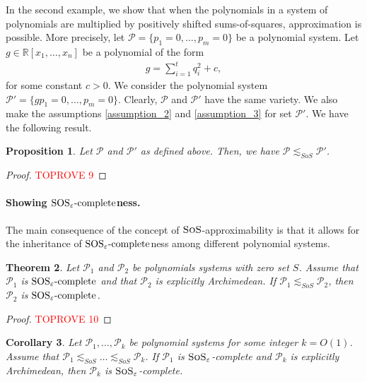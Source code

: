 \documentclass[11pt]{article}
\newcommand{\sos}{\text{\sc{SoS}}}
\newcommand{\1}{\textbf{1}}
\newtheorem{theorem}{Theorem}[section]
\newtheorem{proposition}[theorem]{Proposition}
\newtheorem{corollary}[theorem]{Corollary}
\newcommand{\SOSe}{\rm{SOS}_\varepsilon\text{-complete}}
\begin{document}
In the second example, we show that when the polynomials in a system of polynomials are multiplied by positively shifted sums-of-squares, approximation is possible. More precisely, let $\mathcal{P}=\{p_1 = 0, \dots, p_m = 0\}$ be a polynomial system. Let $g\in \mathbb{R}[x_1, \dots, x_n]$ be a polynomial of the form
\begin{align}\label{sos+p}
    g = \sum_{i=1}^t q_i^2 + c,
\end{align}
for some constant $c > 0$. We consider the polynomial system $\mathcal{P}'=\{gp_1=0, \dots, p_m=0\}$. Clearly, $\mathcal{P}$ and $\mathcal{P}'$ have the same variety. We also make the assumptions \ref{assumption_2} and \ref{assumption_3} for set $\mathcal{P}'$. We have the following result.
\begin{proposition}
    Let $\mathcal{P}$ and $\mathcal{P}'$ as defined above. Then, we have $\mathcal{P} \lesssim_{SoS} \mathcal{P}'$.
\end{proposition}
\begin{proof}\textcolor{red}{TOPROVE 9}\end{proof}

\paragraph{Showing $\SOSe$ness.}

The main consequence of the concept of $\sos$-approximability is that it allows for the inheritance of $\SOSe$ness among different polynomial systems.

\begin{theorem}\label{th:richness_inheritance}
    Let $\mathcal{P}_1$ and $\mathcal{P}_2$ be polynomials systems with zero set $S$. Assume that $\mathcal P_1$ is $\SOSe$ and that $\mathcal{P}_2$ is explicitly Archimedean. If  $\mathcal{P}_1\lesssim_{SoS} \mathcal{P}_2$, then $\mathcal{P}_2$ is $\SOSe$. 
\end{theorem}
\begin{proof}\textcolor{red}{TOPROVE 10}\end{proof}

\begin{corollary}\label{cor:completeness_inheritance}
    Let $\mathcal{P}_1, \dots, \mathcal{P}_k$ be polynomial systems for some integer $k = O(1)$. Assume that $\mathcal{P}_1 \lesssim_{SoS} \dots \lesssim_{SoS} \mathcal{P}_k$. If $\mathcal{P}_1$ is $\sos_{\varepsilon}$-complete and $\mathcal{P}_k$ is explicitly Archimedean, then $\mathcal{P}_k$ is $\sos_{\varepsilon}$-complete.
\end{corollary}
\end{document}
